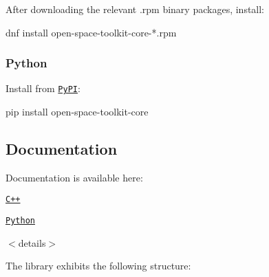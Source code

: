 After downloading the relevant {\ttfamily .rpm} binary packages, install\+:


\begin{DoxyCode}
dnf install open-space-toolkit-core-*.rpm
\end{DoxyCode}


\subsubsection*{Python}

Install from \href{https://pypi.org/project/open-space-toolkit-core/}{\tt Py\+PI}\+:


\begin{DoxyCode}
pip install open-space-toolkit-core
\end{DoxyCode}


\subsection*{Documentation}

Documentation is available here\+:


\begin{DoxyItemize}
\item \href{https://open-space-collective.github.io/open-space-toolkit-core}{\tt C++}
\item \href{./bindings/python/docs}{\tt Python}
\end{DoxyItemize}

$<$details$>$

The library exhibits the following structure\+:


